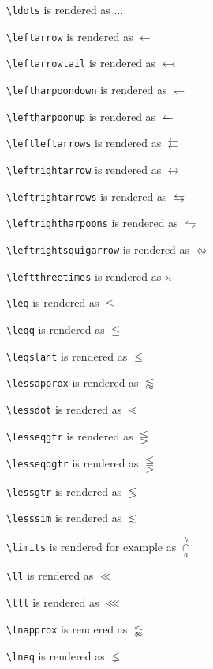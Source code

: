 \texttt{\textbackslash ldots} is rendered as $\ldots$

\texttt{\textbackslash leftarrow} is rendered as $\leftarrow$

\texttt{\textbackslash leftarrowtail} is rendered as $\leftarrowtail$

\texttt{\textbackslash leftharpoondown} is rendered as $\leftharpoondown$

\texttt{\textbackslash leftharpoonup} is rendered as $\leftharpoonup$

\texttt{\textbackslash leftleftarrows} is rendered as $\leftleftarrows$

\texttt{\textbackslash leftrightarrow} is rendered as $\leftrightarrow$

\texttt{\textbackslash leftrightarrows} is rendered as $\leftrightarrows$

\texttt{\textbackslash leftrightharpoons} is rendered as $\leftrightharpoons$

\texttt{\textbackslash leftrightsquigarrow} is rendered as $\leftrightsquigarrow$

\texttt{\textbackslash leftthreetimes} is rendered as $\leftthreetimes$

\texttt{\textbackslash leq} is rendered as $\leq$

\texttt{\textbackslash leqq} is rendered as $\leqq$

\texttt{\textbackslash leqslant} is rendered as $\leqslant$

\texttt{\textbackslash lessapprox} is rendered as $\lessapprox$

\texttt{\textbackslash lessdot} is rendered as $\lessdot$

\texttt{\textbackslash lesseqgtr} is rendered as $\lesseqgtr$

\texttt{\textbackslash lesseqqgtr} is rendered as $\lesseqqgtr$

\texttt{\textbackslash lessgtr} is rendered as $\lessgtr$

\texttt{\textbackslash lesssim} is rendered as $\lesssim$

\texttt{\textbackslash limits} is rendered for example as $\mathop\cap\limits_a^b$

\texttt{\textbackslash ll} is rendered as $\ll$

\texttt{\textbackslash lll} is rendered as $\lll$

\texttt{\textbackslash lnapprox} is rendered as $\lnapprox$

\texttt{\textbackslash lneq} is rendered as $\lneq$

